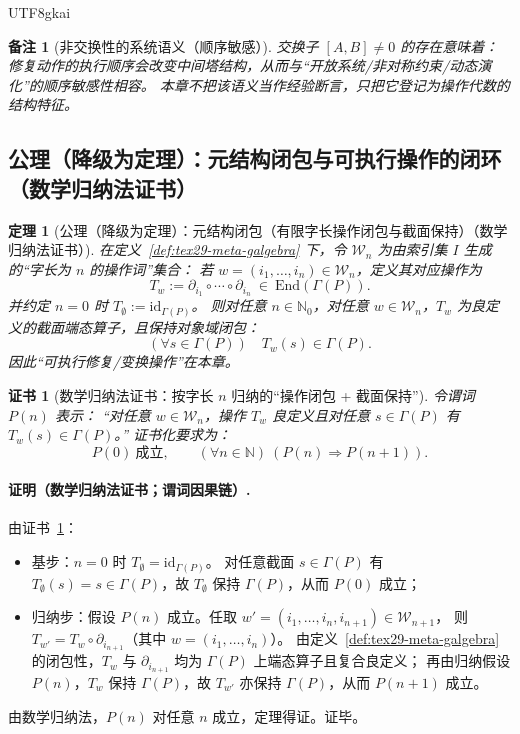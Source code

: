 \documentclass[12pt]{article}
\newtheorem{theorem}{定理}[section]
\newtheorem{remark}{备注}[section]
\newtheorem{Certificate}{证书}[section]
\newcommand{\NN}{\mathbb{N}}
\newcommand{\KouJing}{\texorpdfstring{表述约定}{表述约定}}
\begin{document}
\begin{CJK*}{UTF8}{gkai}
\begin{remark}[非交换性的系统语义（顺序敏感）]
交换子 $[A,B]\neq 0$ 的存在意味着：
修复动作的执行顺序会改变中间塔结构，从而与“开放系统/非对称约束/动态演化”的顺序敏感性相容。
本章不把该语义当作经验断言，只把它登记为操作代数的结构特征。
\end{remark}

\subsection{公理（降级为定理）：元结构闭包与可执行操作的闭环（数学归纳法证书）}
\label{subsec:tex29-meta-closure}

\begin{theorem}[公理（降级为定理）：元结构闭包（有限字长操作闭包与截面保持）（数学归纳法证书）]
\label{thm:tex29-meta-closure}
在定义~\ref{def:tex29-meta-galgebra} 下，令 $\mathcal{W}_n$ 为由索引集 $I$ 生成的“字长为 $n$ 的操作词”集合：
若 $w=(i_1,\dots,i_n)\in \mathcal{W}_n$，定义其对应操作为
\[
  T_w:=\partial_{i_1}\circ\cdots\circ \partial_{i_n}\ \in\ \mathrm{End}(\Gamma(P)).
\]
并约定 $n=0$ 时 $T_{\emptyset}:=\mathrm{id}_{\Gamma(P)}$。
则对任意 $n\in\NN_0$，对任意 $w\in\mathcal{W}_n$，$T_w$ 为良定义的截面端态算子，且保持对象域闭包：
\[
  (\forall s\in\Gamma(P))\quad T_w(s)\in\Gamma(P).
\]
因此“可执行修复/变换操作”在本章。
\end{theorem}

\begin{Certificate}[数学归纳法证书：按字长 $n$ 归纳的“操作闭包 + 截面保持”]
\label{cert:tex29-meta-closure}
令谓词 $P(n)$ 表示：
“对任意 $w\in\mathcal{W}_n$，操作 $T_w$ 良定义且对任意 $s\in\Gamma(P)$ 有 $T_w(s)\in\Gamma(P)$。”
证书化要求为：
\[
  P(0)\ \text{成立},\qquad (\forall n\in\NN)\ (P(n)\Rightarrow P(n+1)).
\]
\end{Certificate}

\paragraph{证明（数学归纳法证书；谓词因果链）.}
由证书~\ref{cert:tex29-meta-closure}：
\begin{itemize}
  \item 基步：$n=0$ 时 $T_{\emptyset}=\mathrm{id}_{\Gamma(P)}$。
  对任意截面 $s\in\Gamma(P)$ 有 $T_{\emptyset}(s)=s\in\Gamma(P)$，故 $T_{\emptyset}$ 保持 $\Gamma(P)$，从而 $P(0)$ 成立；
  \item 归纳步：假设 $P(n)$ 成立。任取 $w'=(i_1,\dots,i_n,i_{n+1})\in\mathcal{W}_{n+1}$，
  则 $T_{w'}=T_w\circ \partial_{i_{n+1}}$（其中 $w=(i_1,\dots,i_n)$）。
  由定义~\ref{def:tex29-meta-galgebra} 的闭包性，$T_w$ 与 $\partial_{i_{n+1}}$ 均为 $\Gamma(P)$ 上端态算子且复合良定义；
  再由归纳假设 $P(n)$，$T_w$ 保持 $\Gamma(P)$，故 $T_{w'}$ 亦保持 $\Gamma(P)$，从而 $P(n+1)$ 成立。
\end{itemize}
由数学归纳法，$P(n)$ 对任意 $n$ 成立，定理得证。证毕。


\end{CJK*}
\end{document}
